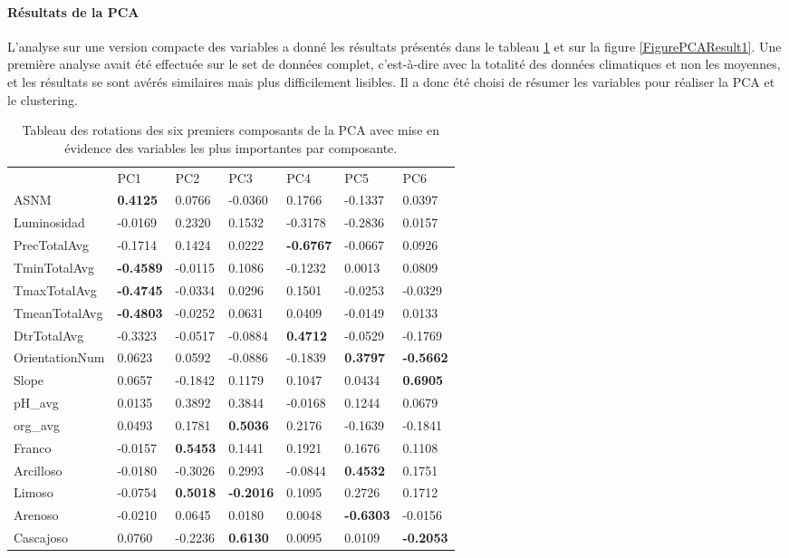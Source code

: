 \paragraph{Résultats de la PCA}

L'analyse sur une version compacte des variables a donné les résultats présentés dans le tableau \ref{TablePCAResult1} et sur la figure \ref{FigurePCAResult1}. Une première analyse avait été effectuée sur le set de données complet, c'est-à-dire avec la totalité des données climatiques et non les moyennes, et les résultats se sont avérés similaires mais plus difficilement lisibles. Il a donc été choisi de résumer les variables pour réaliser la PCA et le clustering.   

\begin{table}[]
	\centering
	\begin{tabular}{lllllll}
		& PC1     & PC2     & PC3     & PC4     & PC5     & PC6     \\
		ASNM           & \textbf{0.4125}  & 0.0766  & -0.0360 & 0.1766  & -0.1337 & 0.0397  \\
		Luminosidad    & -0.0169 & 0.2320  & 0.1532  & -0.3178 & -0.2836 & 0.0157  \\
		PrecTotalAvg   & -0.1714 & 0.1424  & 0.0222  & \textbf{-0.6767} & -0.0667 & 0.0926  \\
		TminTotalAvg   & \textbf{-0.4589} & -0.0115 & 0.1086  & -0.1232 & 0.0013  & 0.0809  \\
		TmaxTotalAvg   & \textbf{-0.4745} & -0.0334 & 0.0296  & 0.1501  & -0.0253 & -0.0329 \\
		TmeanTotalAvg  & \textbf{-0.4803} & -0.0252 & 0.0631  & 0.0409  & -0.0149 & 0.0133  \\
		DtrTotalAvg    & -0.3323 & -0.0517 & -0.0884 & \textbf{0.4712}  & -0.0529 & -0.1769 \\
		OrientationNum & 0.0623  & 0.0592  & -0.0886 & -0.1839 & \textbf{0.3797}  & \textbf{-0.5662} \\
		Slope          & 0.0657  & -0.1842 & 0.1179  & 0.1047  & 0.0434  & \textbf{0.6905}  \\
		pH\_avg        & 0.0135  & 0.3892  & 0.3844  & -0.0168 & 0.1244  & 0.0679  \\
		org\_avg       & 0.0493  & 0.1781  & \textbf{0.5036}  & 0.2176  & -0.1639 & -0.1841 \\
		Franco         & -0.0157 & \textbf{0.5453}  & 0.1441  & 0.1921  & 0.1676  & 0.1108  \\
		Arcilloso      & -0.0180 & -0.3026 & 0.2993  & -0.0844 & \textbf{0.4532}  & 0.1751  \\
		Limoso         & -0.0754 & \textbf{0.5018}  & \textbf{-0.2016} & 0.1095  & 0.2726  & 0.1712  \\
		Arenoso        & -0.0210 & 0.0645  & 0.0180  & 0.0048  & \textbf{-0.6303} & -0.0156 \\
		Cascajoso      & 0.0760  & -0.2236 & \textbf{0.6130}  & 0.0095  & 0.0109  & \textbf{-0.2053}
	\end{tabular}
	\caption{\label{TablePCAResult1}Tableau des rotations des six premiers composants de la PCA avec mise en évidence des variables les plus importantes par composante.}
\end{table}



